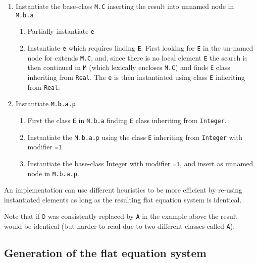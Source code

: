 \begin{example}
\begin{enumerate}
\begin{enumerate}
\begin{enumerate}
\begin{enumerate}
      \end{enumerate}
    \end{enumerate}
  \end{enumerate}
\item
  Instantiate the base-class \lstinline!M.C! inserting the result into unnamed node in \lstinline!M.b.a!
  \begin{enumerate}
  \item
    Partially instantiate \lstinline!e!
  \item
    Instantiate \lstinline!e! which requires finding \lstinline!E!.  First looking for \lstinline!E! in the un-named node for extends \lstinline!M.C!, and, since there is
    no local element \lstinline!E! the search is then continued in \lstinline!M! (which lexically encloses \lstinline!M.C!) and finds \lstinline!E! class inheriting from
    \lstinline!Real!.  The \lstinline!e! is then instantiated using class \lstinline!E! inheriting from \lstinline!Real!.
  \end{enumerate}
\item
  Instantiate \lstinline!M.b.a.p!
  \begin{enumerate}
  \item
    First the class \lstinline!E! in \lstinline!M.b.a! finding \lstinline!E! class inheriting from \lstinline!Integer!.
  \item
    Instantiate the \lstinline!M.b.a.p! using the class \lstinline!E! inheriting from \lstinline!Integer! with modifier \lstinline!=1!
  \item
    Instantiate the base-class Integer with modifier \lstinline!=1!, and insert as unnamed node in \lstinline!M.b.a.p!.
  \end{enumerate}
\end{enumerate}

An implementation can use different heuristics to be more efficient by re-using instantiated elements as long as the resulting flat equation system is identical.

Note that if \lstinline!D! was consistently replaced by \lstinline!A! in the example above the result would be identical (but harder to read due to two different
classes called \lstinline!A!).
\end{example}

\subsection{Generation of the flat equation system}\label{generation-of-the-flat-equation-system}

